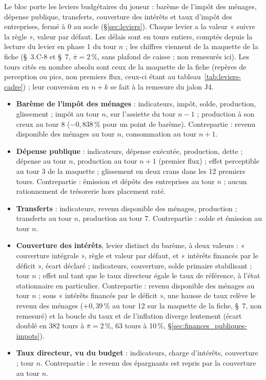 \documentclass[11pt,a4paper]{article}
\begin{document}
\begin{joueur}
Le bloc porte les leviers budgétaires du joueur : barème de l'impôt des ménages, dépense publique, transferts, couverture des intérêts et taux d'impôt des entreprises, fermé à 0 au socle (\S\ref{sec:leviers}). Chaque levier a la valeur « suivre la règle », valeur par défaut. Les délais sont en tours entiers, comptés depuis la lecture du levier en phase 1 du tour $n$ ; les chiffres viennent de la maquette de la fiche (\S~3.C-8 et \S~7, $\bar\pi = 2\,\%$, sans plafond de caisse ; non remesurés ici). Les tours cités en nombre absolu sont ceux de la maquette de la fiche (repères de perception ou pics, non premiers flux, ceux-ci étant au tableau~\ref{tab:leviers-cadre}) ; leur conversion en $n + k$ se fait à la remesure du jalon J4.
\begin{itemize}
\item \textbf{Barème de l'impôt des ménages} : indicateurs, impôt, solde, production, glissement ; impôt au tour $n$, sur l'assiette du tour $n - 1$ ; production à son creux au tour 8 ($-0{,}838\,\%$ pour un point de barème). Contrepartie : revenu disponible des ménages au tour $n$, consommation au tour $n + 1$.
\item \textbf{Dépense publique} : indicateurs, dépense exécutée, production, dette ; dépense au tour $n$, production au tour $n + 1$ (premier flux) ; effet perceptible au tour 3 de la maquette ; glissement en deux crans dans les 12 premiers tours. Contrepartie : émission et dépôts des entreprises au tour $n$ ; aucun rationnement de trésorerie hors placement raté.
\item \textbf{Transferts} : indicateurs, revenu disponible des ménages, production ; transferts au tour $n$, production au tour 7. Contrepartie : solde et émission au tour $n$.
\item \textbf{Couverture des intérêts}, levier distinct du barème, à deux valeurs : « couverture intégrale », règle et valeur par défaut, et « intérêts financés par le déficit », écart déclaré ; indicateurs, couverture, solde primaire stabilisant ; tour $n$ ; effet nul tant que le taux directeur égale le taux de référence, à l'état stationnaire en particulier. Contrepartie : revenu disponible des ménages au tour $n$ ; sous « intérêts financés par le déficit », une hausse de taux relève le revenu des ménages ($+0{,}39\,\%$ au tour 12 sur la maquette de la fiche, \S~7, non remesuré) et la boucle du taux et de l'inflation diverge lentement (écart doublé en 382 tours à $\bar\pi = 2\,\%$, 63 tours à 10\,\%, \S\ref{sec:finances_publiques-impots}).
\item \textbf{Taux directeur, vu du budget} : indicateurs, charge d'intérêts, couverture ; tour $n$. Contrepartie : le revenu des épargnants est repris par la couverture au tour $n$.
\end{itemize}
\end{joueur}
\end{document}

